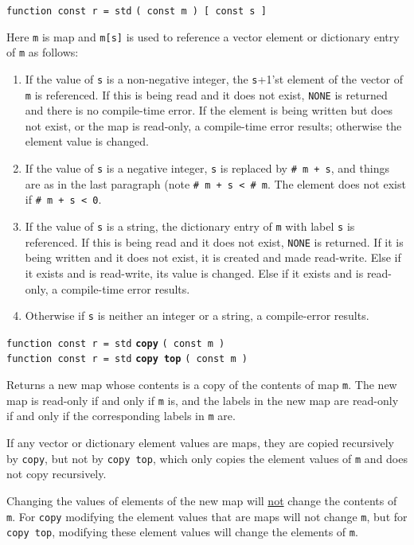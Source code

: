 \documentclass[12pt]{article}
\newcommand{\ttkey}[1]{{\tt \bfseries #1}}
\newenvironment{indpar}[1][0.3in]%
	{\begin{list}{}%
		     {\setlength{\itemsep}{0in}%
		      \setlength{\topsep}{0in}%
		      \setlength{\parsep}{1ex}%
		      \setlength{\labelwidth}{#1}%
		      \setlength{\leftmargin}{#1}%
		      \addtolength{\leftmargin}{\labelsep}}%
	 \item}%
	{\end{list}}
\begin{document}
{\tt function const r = std} {\tt ( const m ) [ const s ]}
\begin{indpar}
Here {\tt m} is map and {\tt m[s]} is used to reference a
vector element or dictionary entry of {\tt m} as follows:
\begin{enumerate}
\item If the value of {\tt s} is a non-negative integer,
the {\tt s}+1'st element
of the vector of {\tt m} is referenced.  If this is being read and
it does not exist, {\tt NONE} is returned and there is no compile-time
error.
If the element is being written but does not exist, or the map
is read-only, a compile-time error results; otherwise the element
value is changed.
\item If the value of {\tt s} is a negative integer,
{\tt s} is replaced by {\tt \# m + s}, and things
are as in the last paragraph (note {\tt \# m + s < \# m}.  The element
does not exist if {\tt \# m + s < 0}.
\item If the value of {\tt s} is a string, the dictionary entry
of {\tt m} with label {\tt s} is referenced.  If this is being read and
it does not exist, {\tt NONE} is returned.  If it is being written and
it does not exist, it is created and made read-write.
Else if it exists and is read-write, its value is changed.
Else if it exists and is read-only, a compile-time error results.
\item Otherwise if {\tt s} is neither an integer or a string,
a compile-error results.
\end{enumerate}
\end{indpar}

{\tt function const r = std} \ttkey{copy} {\tt ( const m )} \\
{\tt function const r = std} \ttkey{copy top} {\tt ( const m )} %
\label{MAP-COPY}
\begin{indpar}
Returns a new map whose contents is a copy of the contents of
map {\tt m}.  The new map is read-only if and only if {\tt m} is,
and the labels in the new map are read-only if and only if the
corresponding labels in {\tt m} are.

If any vector or dictionary element values are maps, they are
copied recursively by {\tt copy}, but not by
{\tt copy top}, which only copies the element values of {\tt m}
and does not copy recursively.

Changing the values of elements of the new map will \underline{not} change
the contents of {\tt m}.  For {\tt copy} modifying the element values
that are maps will not change {\tt m}, but for {\tt copy top},
modifying these element values will change the elements of {\tt m}.

\end{indpar}
\end{document}
